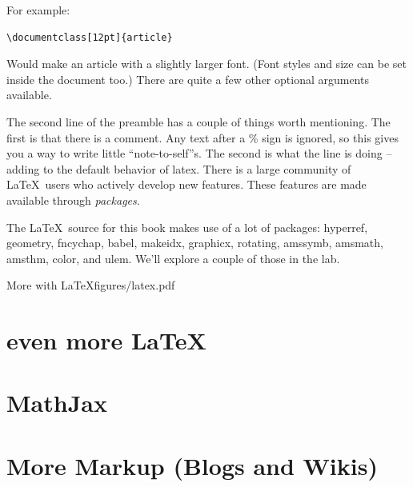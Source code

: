 For example:

\begin{codeblock}
\begin{verbatim}
\documentclass[12pt]{article}

\end{verbatim}
\end{codeblock}

Would make an article with a slightly larger font.  (Font styles and size can be set inside the document too.)  There are quite a few other optional arguments available.

The second line of the preamble has a couple of things worth mentioning.  The first is that there is a comment.  Any text after a \% sign is ignored, so this gives you a way to write little ``note-to-self''s.  The second is what the line is doing -- adding to the default behavior of latex.  There is a large community of \LaTeX\  users who actively develop new features.  These features are made available through {\em packages}.  

The \LaTeX\  source for this book makes use of a lot of packages: 
hyperref, geometry, fncychap, babel, makeidx, graphicx, rotating, amssymb, amsmath, amsthm, color, and ulem.  We'll explore a couple of those in the lab.


\clearpage
\begin{worksheet}{3}{More with \LaTeX}{figures/latex.pdf}

\end{worksheet}
\clearpage

\section{even more LaTeX}
\label{sec:latex}

\section{MathJax}
\label{sec:mathjax}

\section{More Markup (Blogs and Wikis)}
\label{sec:markup}

